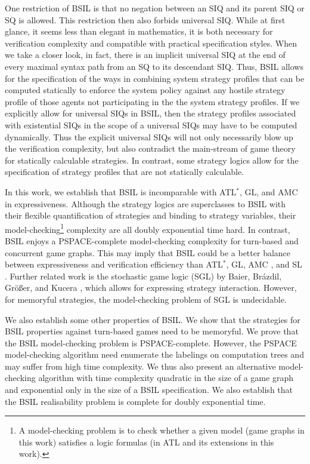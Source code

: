 \label{reply2.motive3} 
One restriction of BSIL is that no negation between an SIQ and its parent SIQ or SQ is allowed. 
This restriction then also forbids universal SIQ.  
While at first glance, it seems less than elegant in mathematics, 
it is both necessary for verification complexity and 
compatible with practical specification styles.  
When we take a closer look, in fact, there is an implicit universal SIQ 
at the end of every maximal syntax path from an SQ to its descendant SIQ.  
Thus, BSIL allows for the specification of the ways in combining system strategy profiles that 
can be computed statically to enforce the system policy against 
any hostile strategy profile of those agents not participating in the the system strategy 
profiles.  
If we explicitly allow for universal SIQs in BSIL, 
then the strategy profiles associated with existential SIQs in the scope of a universal SIQs 
may have to be computed dynamically.  
Thus the explicit universal SIQs will not only necessarily blow up the verification complexity, 
but also contradict the main-stream of game theory for statically calculable strategies.  
In contrast, some strategy logics \cite{MMV10} 
allow for the specification of strategy profiles that are not statically calculable.  

In this work, 
we establish that BSIL is incomparable with ATL$^*$, GL, and AMC 
in expressiveness.  
Although the strategy logics \cite{CHP10,CLM10,MMV10} are superclasses to BSIL  
with their flexible quantification of 
strategies and binding to strategy variables, 
their model-checking\footnote{A 
model-checking problem is to check whether a given model 
(game graphs in this work) satisfies a logic formulas 
(in ATL and its extensions in this work).}  
complexity are all doubly exponential time hard.  
In contrast, BSIL enjoys a PSPACE-complete model-checking complexity for 
turn-based and concurrent game graphs.  
This may imply that BSIL could be a better balance between 
expressiveness and verification efficiency 
than ATL$^*$, GL, AMC \cite{AHK02}, and SL \cite{CHP10,MMV10}.
Further related work is the stochastic game logic (SGL) by Baier, Br\'azdil,
Gr\"o{\ss}er, and Kucera \cite{BBGK07}, which allows for expressing strategy interaction.
However, for memoryful strategies, the model-checking problem of SGL is undecidable. 


We also establish some other properties of BSIL. 
We show that the strategies  
for BSIL properties against turn-based games need to be memoryful. 
We prove that the BSIL model-checking problem is PSPACE-complete.  
However, the PSPACE model-checking algorithm need enumerate the 
labelings on computation trees and may suffer from high time complexity.  
We thus also present an alternative model-checking algorithm 
with time complexity quadratic in the size of a game graph and 
exponential only in the size of a BSIL specification. 
We also establish that the BSIL realisability problem is complete for
doubly exponential time.  



